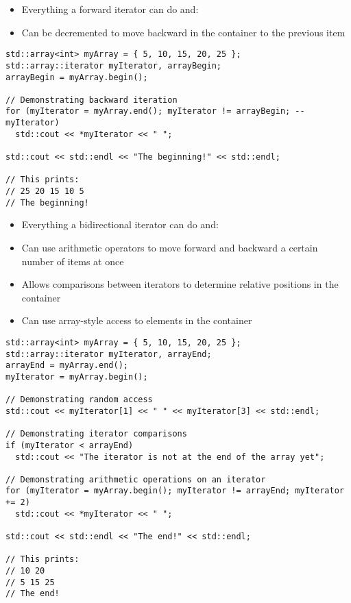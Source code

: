 
\begin{itemize}
	\item Everything a forward iterator can do and:
	\item Can be decremented to move backward in the container to the previous item
\end{itemize}

\begin{lstlisting}
std::array<int> myArray = { 5, 10, 15, 20, 25 };
std::array::iterator myIterator, arrayBegin;
arrayBegin = myArray.begin();

// Demonstrating backward iteration
for (myIterator = myArray.end(); myIterator != arrayBegin; --myIterator)
  std::cout << *myIterator << " ";

std::cout << std::endl << "The beginning!" << std::endl;

// This prints:
// 25 20 15 10 5
// The beginning!
\end{lstlisting}


\begin{itemize}
	\item Everything a bidirectional iterator can do and:
	\item Can use arithmetic operators to move forward and backward a certain number of items at once
	\item Allows comparisons between iterators to determine relative positions in the container
	\item Can use array-style access to elements in the container
\end{itemize}

\begin{lstlisting}
std::array<int> myArray = { 5, 10, 15, 20, 25 };
std::array::iterator myIterator, arrayEnd;
arrayEnd = myArray.end();
myIterator = myArray.begin();

// Demonstrating random access
std::cout << myIterator[1] << " " << myIterator[3] << std::endl;

// Demonstrating iterator comparisons
if (myIterator < arrayEnd)
  std::cout << "The iterator is not at the end of the array yet";

// Demonstrating arithmetic operations on an iterator
for (myIterator = myArray.begin(); myIterator != arrayEnd; myIterator += 2)
  std::cout << *myIterator << " ";

std::cout << std::endl << "The end!" << std::endl;

// This prints:
// 10 20
// 5 15 25
// The end!
\end{lstlisting}

